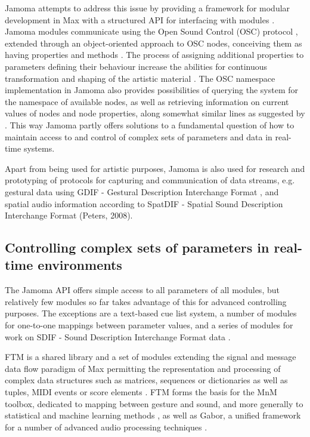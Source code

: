 \documentclass{article}
\begin{document}
Jamoma  attempts to address this issue by providing a framework for modular development in Max with a structured API for interfacing with modules \cite{Place:2006jamoma}. Jamoma modules communicate using the Open Sound Control (OSC) protocol \cite{Wright_2002_OSC}, extended through an object-oriented approach to OSC nodes, conceiving them as having properties and methods \cite{Place:2008osc_properties}. The process of assigning additional properties to parameters defining their behaviour increase the abilities for continuous transformation and shaping of the artistic material \cite{Place_2008_flexible_control}. The OSC namespace implementation in Jamoma also provides possibilities of querying the system for the namespace of available nodes, as well as retrieving information on current values of nodes and node properties, along somewhat similar lines as suggested by \cite{Jazzmutant:2006_osc2}. This way Jamoma partly offers solutions to a fundamental question of how to maintain access to and control of complex sets of parameters and data in real-time systems.

Apart from being used for artistic purposes, Jamoma is also used for research and prototyping of protocols for capturing and communication of data streams, e.g. gestural data using GDIF - Gestural Description Interchange Format \cite{Jensenius:2006a}, \cite{Nymoen_2008_GDIF_sync} and spatial audio information according to SpatDIF - Spatial Sound Description Interchange Format (Peters, 2008).

\subsection{Controlling complex sets of parameters in real-time environments}

The Jamoma  API offers simple access to all parameters of all modules, but relatively few modules so far takes advantage of this for advanced controlling purposes. The exceptions are a text-based cue list system, a number of modules for one-to-one mappings between parameter values, and a series of modules for work on SDIF - Sound Description Interchange Format data \cite{Nymoen_2008_GDIF_sync}.

FTM is a shared library and a set of modules extending the signal and message data ﬂow paradigm of Max permitting the representation and processing of complex data structures such as matrices, sequences or dictionaries as well as tuples, MIDI events or score elements \cite{Schnell:2005ftm}. FTM forms the basis for the MnM toolbox, dedicated to mapping between gesture and sound, and more generally to statistical and machine learning methods \cite{Bevilacqua:2005mnm}, as well as Gabor, a unified framework for a number of advanced audio processing techniques \cite{Schnell_2005_Gabor}.
\end{document}
